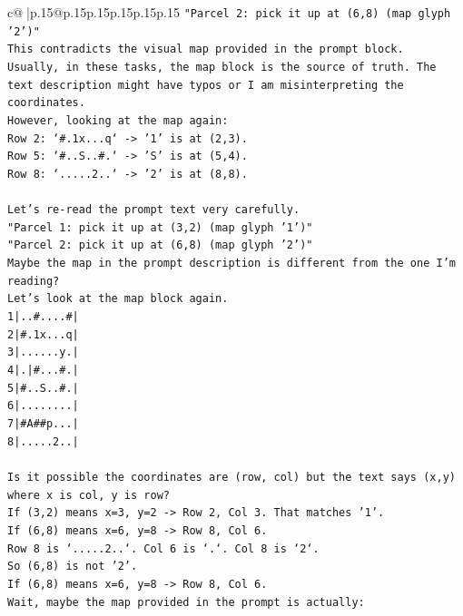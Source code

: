 \documentclass{article}
\begin{document}
{\begin{supertabular}{c@{$\;$}|p{.15\linewidth}@{}p{.15\linewidth}p{.15\linewidth}p{.15\linewidth}p{.15\linewidth}p{.15\linewidth}}
{{{\texttt{"Parcel 2: pick it up at (6,8) (map glyph '2')"} \\
\texttt{This contradicts the visual map provided in the prompt block.} \\
\texttt{Usually, in these tasks, the map block is the source of truth. The text description might have typos or I am misinterpreting the coordinates.} \\
\texttt{However, looking at the map again:} \\
\texttt{Row 2: `\#.1x...q` {-}> '1' is at (2,3).} \\
\texttt{Row 5: `\#..S..\#.` {-}> 'S' is at (5,4).} \\
\texttt{Row 8: `.....2..` {-}> '2' is at (8,8).} \\
\\ 
\texttt{Let's re{-}read the prompt text very carefully.} \\
\texttt{"Parcel 1: pick it up at (3,2) (map glyph '1')"} \\
\texttt{"Parcel 2: pick it up at (6,8) (map glyph '2')"} \\
\texttt{Maybe the map in the prompt description is different from the one I'm reading?} \\
\texttt{Let's look at the map block again.} \\
\texttt{1|..\#....\#|} \\
\texttt{2|\#.1x...q|} \\
\texttt{3|......y.|} \\
\texttt{4|.|\#...\#.|} \\
\texttt{5|\#..S..\#.|} \\
\texttt{6|........|} \\
\texttt{7|\#A\#\#p...|} \\
\texttt{8|.....2..|} \\
\\ 
\texttt{Is it possible the coordinates are (row, col) but the text says (x,y) where x is col, y is row?} \\
\texttt{If (3,2) means x=3, y=2 {-}> Row 2, Col 3. That matches '1'.} \\
\texttt{If (6,8) means x=6, y=8 {-}> Row 8, Col 6.} \\
\texttt{Row 8 is `.....2..`. Col 6 is `.`. Col 8 is `2`.} \\
\texttt{So (6,8) is not '2'.} \\
\texttt{If (6,8) means x=6, y=8 {-}> Row 8, Col 6.} \\
\texttt{Wait, maybe the map provided in the prompt is actually:} \\
}}}
\end{supertabular}}
\end{document}
